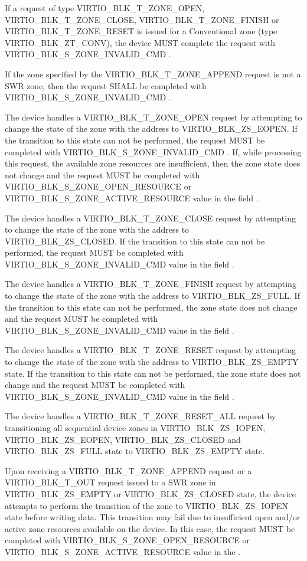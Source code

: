 If a request of type VIRTIO_BLK_T_ZONE_OPEN, VIRTIO_BLK_T_ZONE_CLOSE,
VIRTIO_BLK_T_ZONE_FINISH or VIRTIO_BLK_T_ZONE_RESET is issued for a Conventional
zone (type VIRTIO_BLK_ZT_CONV), the device MUST complete the request with
VIRTIO_BLK_S_ZONE_INVALID_CMD .

If the zone specified by the VIRTIO_BLK_T_ZONE_APPEND request is not a SWR zone,
then the request SHALL be completed with VIRTIO_BLK_S_ZONE_INVALID_CMD
.

The device handles a VIRTIO_BLK_T_ZONE_OPEN request by attempting to change the
state of the zone with the  address to VIRTIO_BLK_ZS_EOPEN. If the
transition to this state can not be performed, the request MUST be completed
with VIRTIO_BLK_S_ZONE_INVALID_CMD . If, while processing this
request, the available zone resources are insufficient, then the zone state does
not change and the request MUST be completed with
VIRTIO_BLK_S_ZONE_OPEN_RESOURCE or VIRTIO_BLK_S_ZONE_ACTIVE_RESOURCE value in
the field .

The device handles a VIRTIO_BLK_T_ZONE_CLOSE request by attempting to change the
state of the zone with the  address to VIRTIO_BLK_ZS_CLOSED. If
the transition to this state can not be performed, the request MUST be completed
with VIRTIO_BLK_S_ZONE_INVALID_CMD value in the field .

The device handles a VIRTIO_BLK_T_ZONE_FINISH request by attempting to change
the state of the zone with the  address to VIRTIO_BLK_ZS_FULL. If
the transition to this state can not be performed, the zone state does not
change and the request MUST be completed with VIRTIO_BLK_S_ZONE_INVALID_CMD
value in the field .

The device handles a VIRTIO_BLK_T_ZONE_RESET request by attempting to change the
state of the zone with the  address to VIRTIO_BLK_ZS_EMPTY state.
If the transition to this state can not be performed, the zone state does not
change and the request MUST be completed with VIRTIO_BLK_S_ZONE_INVALID_CMD
value in the field .

The device handles a VIRTIO_BLK_T_ZONE_RESET_ALL request by transitioning all
sequential device zones in VIRTIO_BLK_ZS_IOPEN, VIRTIO_BLK_ZS_EOPEN,
VIRTIO_BLK_ZS_CLOSED and VIRTIO_BLK_ZS_FULL state to VIRTIO_BLK_ZS_EMPTY state.

Upon receiving a VIRTIO_BLK_T_ZONE_APPEND request or a VIRTIO_BLK_T_OUT
request issued to a SWR zone in VIRTIO_BLK_ZS_EMPTY or VIRTIO_BLK_ZS_CLOSED
state, the device attempts to perform the transition of the zone to
VIRTIO_BLK_ZS_IOPEN state before writing data. This transition may fail due to
insufficient open and/or active zone resources available on the device. In this
case, the request MUST be completed with VIRTIO_BLK_S_ZONE_OPEN_RESOURCE or
VIRTIO_BLK_S_ZONE_ACTIVE_RESOURCE value in the .

